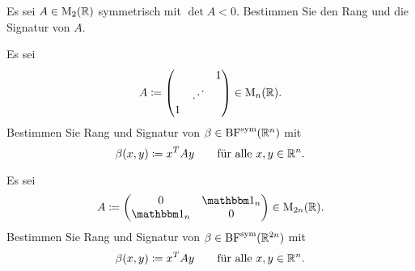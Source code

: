 \documentclass[a4paper, 10pt]{scrartcl}
\begin{document}





\begin{question}[subtitle = Eine symmetrische $(2 \times 2)$-Matrix]
  Es sei $A \in \operatorname{M}_{2}(\mathbb{R})$ symmetrisch mit $\det A < 0$.
  Bestimmen Sie den Rang und die Signatur von $A$.
\end{question}





\begin{question}[subtitle = Rang und Signatur I\,]
  Es sei
  \[
              A
    \coloneqq \begin{pmatrix}
                  &         & 1 \\
                  & \iddots &   \\
                1 &         &
              \end{pmatrix}
    \in \operatorname{M}_{n}(\mathbb{R}).
  \]
  Bestimmen Sie Rang und Signatur von $\beta \in \operatorname{BF}^{\operatorname{sym}}(\mathbb{R}^n)$ mit
  \[
              \beta(x,y)
    \coloneqq x^T A y
    \qquad
    \text{für alle $x, y \in \mathbb{R}^n$}.
  \]
\end{question}





\begin{question}[subtitle = Rang und Signatur II\,]
  Es sei
  \[
              A
    \coloneqq \begin{pmatrix}
                0     & \Id_n \\
                \Id_n & 0
              \end{pmatrix}
    \in       \matrices{2n}{\Real}.
  \]
  Bestimmen Sie Rang und Signatur von $\beta \in \operatorname{BF}^{\operatorname{sym}}(\mathbb{R}^{2n})$ mit
  \[
              \beta(x,y)
    \coloneqq x^T A y
    \qquad
    \text{für alle $x, y \in \mathbb{R}^n$}.
  \]
\end{question}
\end{document}
